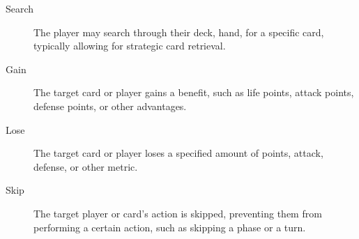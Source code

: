 \begin{description}
  \item[Search] The player may search through their deck, hand, for a specific card, typically allowing for strategic card retrieval.  
  \item[Gain] The target card or player gains a benefit, such as life points, attack points, defense points, or other advantages.  
  \item[Lose] The target card or player loses a specified amount of points, attack, defense, or other metric.  
  \item[Skip] The target player or card’s action is skipped, preventing them from performing a certain action, such as skipping a phase or a turn.
\end{description}






